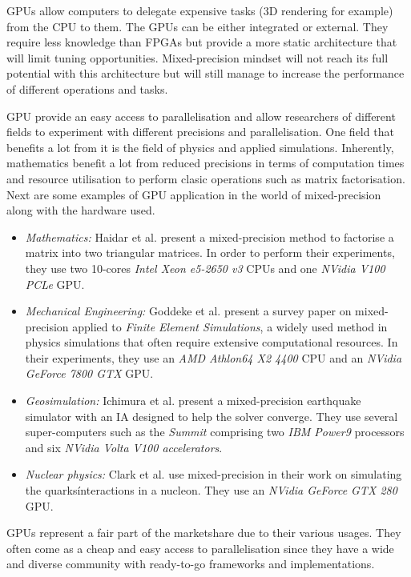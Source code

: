 GPUs allow computers to delegate expensive tasks (3D rendering for example) from the CPU to them. The GPUs can be either integrated or external. They require less knowledge than FPGAs but provide a more static architecture that will limit tuning opportunities. Mixed-precision mindset will not reach its full potential with this architecture but will still manage to increase the performance of different operations and tasks.

GPU provide an easy access to parallelisation and allow researchers of different fields to experiment with different precisions and parallelisation. One field that benefits a lot from it is the field of physics and applied simulations. Inherently, mathematics benefit a lot from reduced precisions in terms of computation times and resource utilisation to perform clasic operations such as matrix factorisation. Next are some examples of GPU application in the world of mixed-precision along with the hardware used.

\begin{itemize}
  \item \emph{Mathematics:} Haidar et al. \cite{Haidar2018} present a mixed-precision method to factorise a matrix into two triangular matrices. In order to perform their experiments, they use two 10-cores \emph{Intel Xeon e5-2650 v3} CPUs and one \emph{NVidia V100 PCLe} GPU.
  \item \emph{Mechanical Engineering:} Goddeke et al. \cite{Goddeke2007} present a survey paper on mixed-precision applied to \emph{Finite Element Simulations}, a widely used method in physics simulations that often require extensive computational resources. In their experiments, they use an \emph{AMD Athlon64 X2 4400} CPU and an \emph{NVidia GeForce 7800 GTX} GPU.
  \item \emph{Geosimulation:} Ichimura et al. \cite{Ichimura2018} present a mixed-precision earthquake simulator with an IA designed to help the solver converge. They use several super-computers such as the \emph{Summit} comprising two \emph{IBM Power9} processors and six \emph{NVidia Volta V100 accelerators}.
  \item \emph{Nuclear physics:} Clark et al. \cite{Clark2010} use mixed-precision in their work on simulating the quarks\' interactions in a nucleon. They use an \emph{NVidia GeForce GTX 280} GPU.
\end{itemize}

GPUs represent a fair part of the marketshare due to their various usages. They often come as a cheap and easy access to parallelisation since they have a wide and diverse community with ready-to-go frameworks and implementations.

